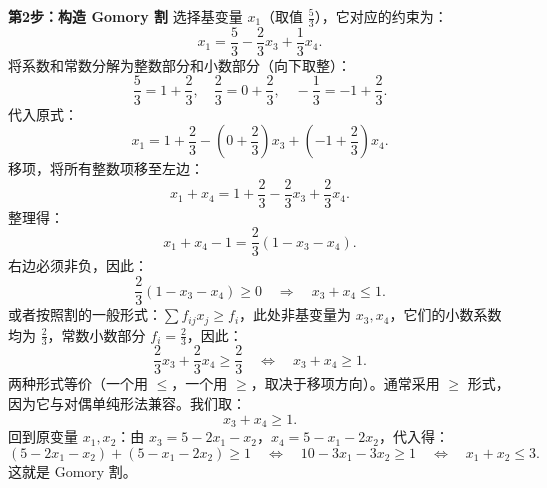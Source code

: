 \documentclass[12pt]{article}
\theoremstyle{plain}
\theoremstyle{definition}
\begin{document}
\textbf{第2步：构造 Gomory 割}  
选择基变量 $x_1$（取值 $\frac{5}{3}$），它对应的约束为：
\[ x_1 = \frac{5}{3} - \frac{2}{3}x_3 + \frac{1}{3}x_4. \]
将系数和常数分解为整数部分和小数部分（向下取整）：
\[
\frac{5}{3} = 1 + \frac{2}{3},\quad \frac{2}{3} = 0 + \frac{2}{3},\quad -\frac{1}{3} = -1 + \frac{2}{3}.
\]
代入原式：
\[
x_1 = 1 + \frac{2}{3} - \left(0 + \frac{2}{3}\right)x_3 + \left(-1 + \frac{2}{3}\right)x_4.
\]
移项，将所有整数项移至左边：
\[ x_1 + x_4 = 1 + \frac{2}{3} - \frac{2}{3}x_3 + \frac{2}{3}x_4. \]
整理得：
\[ x_1 + x_4 - 1 = \frac{2}{3}(1 - x_3 - x_4). \]
右边必须非负，因此：
\[ \frac{2}{3}(1 - x_3 - x_4) \ge 0 \quad \Longrightarrow \quad x_3 + x_4 \le 1. \]
或者按照割的一般形式：$\sum f_{ij}x_j \ge f_i$，此处非基变量为 $x_3, x_4$，它们的小数系数均为 $\frac{2}{3}$，常数小数部分 $f_i = \frac{2}{3}$，因此：
\[
\frac{2}{3}x_3 + \frac{2}{3}x_4 \ge \frac{2}{3} \quad \Longleftrightarrow \quad x_3 + x_4 \ge 1.
\]
两种形式等价（一个用 $\le$，一个用 $\ge$，取决于移项方向）。通常采用 $\ge$ 形式，因为它与对偶单纯形法兼容。我们取：
\[ x_3 + x_4 \ge 1. \]
回到原变量 $x_1, x_2$：由 $x_3 = 5 - 2x_1 - x_2$，$x_4 = 5 - x_1 - 2x_2$，代入得：
\[ (5 - 2x_1 - x_2) + (5 - x_1 - 2x_2) \ge 1 \quad \Longleftrightarrow \quad 10 -  3x_1 - 3x_2 \ge 1 \quad \Longleftrightarrow \quad x_1 + x_2 \le 3. \]
这就是 Gomory 割。
\end{document}
